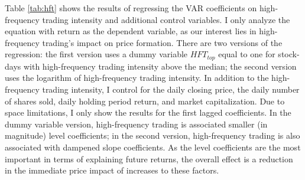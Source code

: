 	Table \ref{tab:hft} shows the results of regressing the VAR coefficients on high-frequency trading intensity and additional control variables. I only analyze the equation with return as the dependent variable, as our interest lies in high-frequency trading's impact on price formation. There are two versions of the regression: the first version uses a dummy variable $HFT_{top}$ equal to one for stock-days with high-frequency trading intensity above the median; the second version uses the logarithm of high-frequency trading intensity. In addition to the high-frequency trading intensity, I control for the daily closing price, the daily number of shares sold, daily holding period return, and market capitalization. Due to space limitations, I only show the results for the first lagged coefficients. In the dummy variable version, high-frequency trading is associated smaller (in magnitude) level coefficients; in the second version, high-frequency trading is also associated with dampened slope coefficients. As the level coefficients are the most important in terms of explaining future returns, the overall effect is a reduction in the immediate price impact of increases to these factors.

